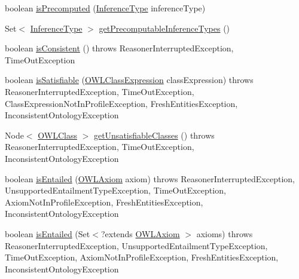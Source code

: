 \begin{DoxyCompactItemize}
\item 
boolean \hyperlink{interfaceorg_1_1semanticweb_1_1owlapi_1_1reasoner_1_1_o_w_l_reasoner_a5345b596c776234883a7b09f89af3653}{is\-Precomputed} (\hyperlink{enumorg_1_1semanticweb_1_1owlapi_1_1reasoner_1_1_inference_type}{Inference\-Type} inference\-Type)
\item 
Set$<$ \hyperlink{enumorg_1_1semanticweb_1_1owlapi_1_1reasoner_1_1_inference_type}{Inference\-Type} $>$ \hyperlink{interfaceorg_1_1semanticweb_1_1owlapi_1_1reasoner_1_1_o_w_l_reasoner_a243576d54506986e881a9dc9c61e76cc}{get\-Precomputable\-Inference\-Types} ()
\item 
boolean \hyperlink{interfaceorg_1_1semanticweb_1_1owlapi_1_1reasoner_1_1_o_w_l_reasoner_a683cbac25e06ba89ed0a0476d93c7877}{is\-Consistent} ()  throws Reasoner\-Interrupted\-Exception, Time\-Out\-Exception
\item 
boolean \hyperlink{interfaceorg_1_1semanticweb_1_1owlapi_1_1reasoner_1_1_o_w_l_reasoner_a1763541bf91b10f9807647e481076eef}{is\-Satisfiable} (\hyperlink{interfaceorg_1_1semanticweb_1_1owlapi_1_1model_1_1_o_w_l_class_expression}{O\-W\-L\-Class\-Expression} class\-Expression)  throws Reasoner\-Interrupted\-Exception, Time\-Out\-Exception, Class\-Expression\-Not\-In\-Profile\-Exception, Fresh\-Entities\-Exception, Inconsistent\-Ontology\-Exception
\item 
Node$<$ \hyperlink{interfaceorg_1_1semanticweb_1_1owlapi_1_1model_1_1_o_w_l_class}{O\-W\-L\-Class} $>$ \hyperlink{interfaceorg_1_1semanticweb_1_1owlapi_1_1reasoner_1_1_o_w_l_reasoner_ae9ead4bfb1d306f15179d8642317706d}{get\-Unsatisfiable\-Classes} ()  throws Reasoner\-Interrupted\-Exception, Time\-Out\-Exception, Inconsistent\-Ontology\-Exception
\item 
boolean \hyperlink{interfaceorg_1_1semanticweb_1_1owlapi_1_1reasoner_1_1_o_w_l_reasoner_a078ec0ac44d288edd2b7747e5790d1d3}{is\-Entailed} (\hyperlink{interfaceorg_1_1semanticweb_1_1owlapi_1_1model_1_1_o_w_l_axiom}{O\-W\-L\-Axiom} axiom)  throws Reasoner\-Interrupted\-Exception, Unsupported\-Entailment\-Type\-Exception, Time\-Out\-Exception, Axiom\-Not\-In\-Profile\-Exception, Fresh\-Entities\-Exception, Inconsistent\-Ontology\-Exception
\item 
boolean \hyperlink{interfaceorg_1_1semanticweb_1_1owlapi_1_1reasoner_1_1_o_w_l_reasoner_a843b4375e26a5f12fd06566fc7807c9e}{is\-Entailed} (Set$<$?extends \hyperlink{interfaceorg_1_1semanticweb_1_1owlapi_1_1model_1_1_o_w_l_axiom}{O\-W\-L\-Axiom} $>$ axioms)  throws Reasoner\-Interrupted\-Exception, Unsupported\-Entailment\-Type\-Exception, Time\-Out\-Exception, Axiom\-Not\-In\-Profile\-Exception, Fresh\-Entities\-Exception, Inconsistent\-Ontology\-Exception

\end{DoxyCompactItemize}
